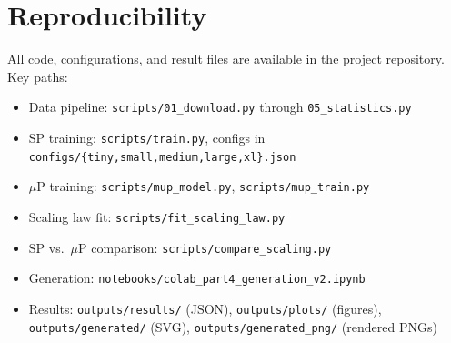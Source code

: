 \documentclass[10pt,letterpaper]{article}
\begin{document}
\section{Reproducibility}
\label{app:repro}

All code, configurations, and result files are available in the project
repository. Key paths:
\begin{itemize}[leftmargin=*, nosep, itemsep=0pt]
  \item Data pipeline: \texttt{scripts/01\_download.py} through
    \texttt{05\_statistics.py}
  \item SP training: \texttt{scripts/train.py}, configs in
    \texttt{configs/\{tiny,small,medium,large,xl\}.json}
  \item $\mu$P training: \texttt{scripts/mup\_model.py},
    \texttt{scripts/mup\_train.py}
  \item Scaling law fit: \texttt{scripts/fit\_scaling\_law.py}
  \item SP vs.\ $\mu$P comparison: \texttt{scripts/compare\_scaling.py}
  \item Generation: \texttt{notebooks/colab\_part4\_generation\_v2.ipynb}
  \item Results: \texttt{outputs/results/} (JSON), \texttt{outputs/plots/}
    (figures), \texttt{outputs/generated/} (SVG), \texttt{outputs/generated\_png/}
    (rendered PNGs)
\end{itemize}
\end{document}
